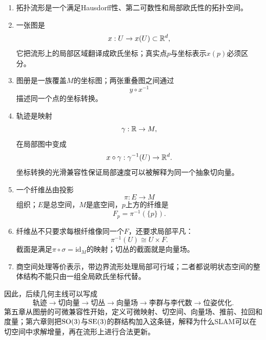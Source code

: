 \begin{enumerate}
    \item 拓扑流形是一个满足Hausdorff性、第二可数性和局部欧氏性的拓扑空间。
    \item 一张图是
    \[
        x:U\to x(U)\subset\mathbb{R}^d,
    \]
    它把流形上的局部区域翻译成欧氏坐标；真实点$p$与坐标表示$x(p)$必须区分。
    \item 图册是一族覆盖$M$的坐标图；两张重叠图之间通过
    \[
        y\circ x^{-1}
    \]
    描述同一个点的坐标转换。
    \item 轨迹是映射
    \[
        \gamma:\mathbb{R}\to M,
    \]
    在局部图中变成
    \[
        x\circ\gamma:\gamma^{-1}(U)\to\mathbb{R}^d.
    \]
    坐标转换的光滑兼容性保证局部速度可以被解释为同一个抽象切向量。
    \item 一个纤维丛由投影
    \[
        \pi:E\to M
    \]
    组织；$E$是总空间，$M$是底空间，$p$上方的纤维是
    \[
        F_p=\pi^{-1}(\{p\}).
    \]
    \item 纤维丛不只要求每根纤维像同一个$F$，还要求局部平凡：
    \[
        \pi^{-1}(U)\cong U\times F.
    \]
    截面是满足$\pi\circ\sigma=\mathrm{id}_M$的映射；切丛的截面就是向量场。
    \item 商空间处理等价表示，带边界流形处理局部可行域；二者都说明状态空间的整体结构不能只由一组全局欧氏坐标代替。
\end{enumerate}

因此，后续几何主线可以写成
\[
    \text{轨迹}
    \longrightarrow
    \text{切向量}
    \longrightarrow
    \text{切丛}
    \longrightarrow
    \text{向量场}
    \longrightarrow
    \text{李群与李代数}
    \longrightarrow
    \text{位姿优化}.
\]
第五章从图册的可微兼容性开始，定义可微映射、切空间、向量场、推前、拉回和度量；第六章则把$\operatorname{SO}(3)$与$\operatorname{SE}(3)$的群结构加入这条链，解释为什么SLAM可以在切空间中求解增量，再在流形上进行合法更新。
